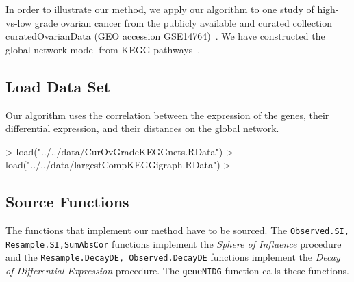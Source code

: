 \documentclass[11pt]{article}
\begin{document}
In order to illustrate our method, we apply our algorithm  to one study  of
high-vs-low grade ovarian cancer  from the publicly available and curated
collection curatedOvarianData (GEO accession GSE14764)~\cite{Ganzfried2013}. We
have  constructed the global network model from KEGG
pathways~\cite{Kanehisa2008}.


\subsection*{Load Data Set} %


Our algorithm uses the correlation between the expression of the genes, their
differential expression, and their distances on the global network. 


\begin{Schunk}
\begin{Sinput}
> load("../../data/CurOvGradeKEGGnets.RData")
> load("../../data/largestCompKEGGigraph.RData")
> 
\end{Sinput}
\end{Schunk}








\subsection*{Source Functions} %

The functions that implement our method have to be sourced. The \texttt{Observed.SI,
Resample.SI,SumAbsCor} functions implement the \textit{Sphere of Influence} procedure
and the \texttt{Resample.DecayDE, Observed.DecayDE} functions implement the 
\textit{Decay of Differential Expression} procedure. The \texttt{geneNIDG}
function calls these functions. 
\end{document}
